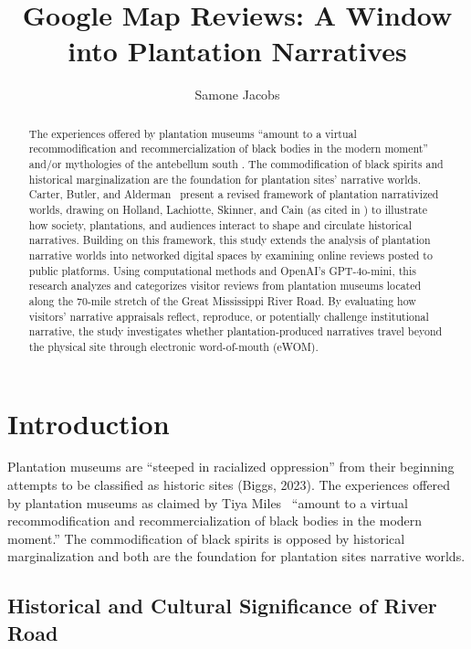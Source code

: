 \documentclass[final]{anthology-ch} %
\title{Google Map Reviews: A Window into Plantation Narratives}
\author[1]{Samone Jacobs}[
  orcid=
]
\affiliation{1}{School of Information \& Library Science, University of North Carolina at Chapel Hill, Chapel Hill, NC, USA}
\begin{document}
\maketitle

\begin{abstract}
The experiences offered by plantation museums \enquote{amount to a virtual recommodification and recommercialization of black bodies in the modern moment} and/or mythologies of the antebellum south \cite{miles2015tales, modlin2008tales}. The commodification of black spirits and historical marginalization are the foundation for plantation sites' narrative worlds. Carter, Butler, and Alderman~\cite{carter2014house} present a revised framework of plantation narrativized worlds, drawing on Holland, Lachiotte, Skinner, and Cain (as cited in \cite{carter2014house}) to illustrate how society, plantations, and audiences interact to shape and circulate historical narratives. Building on this framework, this study extends the analysis of plantation narrative worlds into networked digital spaces by examining online reviews posted to public platforms. Using computational methods and OpenAI's GPT-4o-mini, this research analyzes and categorizes visitor reviews from plantation museums located along the 70-mile stretch of the Great Mississippi River Road. By evaluating how visitors' narrative appraisals reflect, reproduce, or potentially challenge institutional narrative, the study investigates whether plantation-produced narratives travel beyond the physical site through electronic word-of-mouth (eWOM).
\end{abstract}

\section{Introduction} \label{sec:intro}

Plantation museums are \enquote{steeped in racialized oppression} from their beginning attempts to be classified as historic sites (Biggs, 2023). The experiences offered by plantation museums as claimed by Tiya Miles~\cite{miles2015tales} \enquote{amount to a virtual recommodification and recommercialization of black bodies in the modern moment.} The commodification of black spirits is opposed by historical marginalization and both are the foundation for plantation sites narrative worlds.

\subsection{Historical and Cultural Significance of River Road} \label{sec:riverroad}
\end{document}

